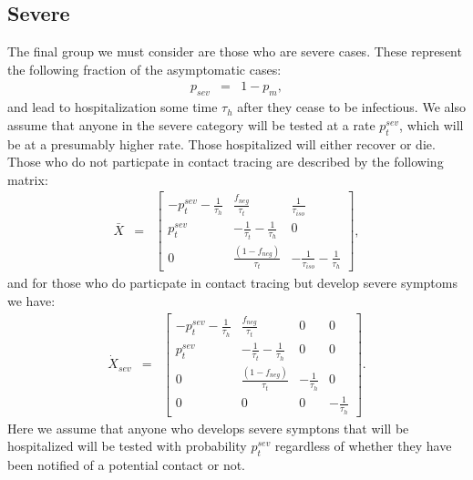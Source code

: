\documentclass{article}
\begin{document}
\subsection{Severe}
The final group we must consider are those who are severe cases. These represent the following fraction of the asymptomatic cases:
\begin{eqnarray}
p_{sev} &=& 1 - p_{m},
\end{eqnarray}
and lead to hospitalization some time $\tau_{h}$ after they cease to be infectious. We also assume that anyone in the severe category will be tested at a rate $p^{sev}_{t}$, which will be at a presumably higher rate. Those hospitalized will either recover or die. Those who do not particpate in contact tracing are described by the following matrix:
\begin{eqnarray}
\bar{X} &=&
\begin{bmatrix}
- p^{sev}_{t} -\frac{1}{\tau_{h}}  &  \frac{f_{neg}}{\tau_{t}}            & \frac{1}{\tau_{iso}} \\ 
 p^{sev}_{t}              & -\frac{1}{\tau_{t}} -\frac{1}{\tau_{h}}       & 0  \\ 
 0                  & \frac{(1- f_{neg})}{\tau_{t}}                        & -\frac{1}{\tau_{iso}} -\frac{1}{\tau_{h}}
\end{bmatrix},
\end{eqnarray}
and for those who do particpate in contact tracing but develop severe symptoms we have:
\begin{eqnarray}
\dot{X}_{sev} &=&
\begin{bmatrix}
- p^{sev}_{t}   - \frac{1}{\tau_{h}}      &  \frac{f_{neg}}{\tau_{t}}    & 0  & 0\\
p^{sev}_{t}                  &  -\frac{1}{\tau_{t}}  - \frac{1}{\tau_{h}}  & 0 & 0\\
0 & \frac{(1-f_{neg})}{\tau_{t}}  &  -  \frac{1}{\tau_{h}} & 0 \\ 
0 & 0 & 0 &  -  \frac{1}{\tau_{h}}
\end{bmatrix}.
\end{eqnarray}
Here we assume that anyone who develops severe symptons that will be hospitalized will be tested with probability $p^{sev}_{t}$ regardless of whether they have been notified of a potential contact or not.  
\end{document}
